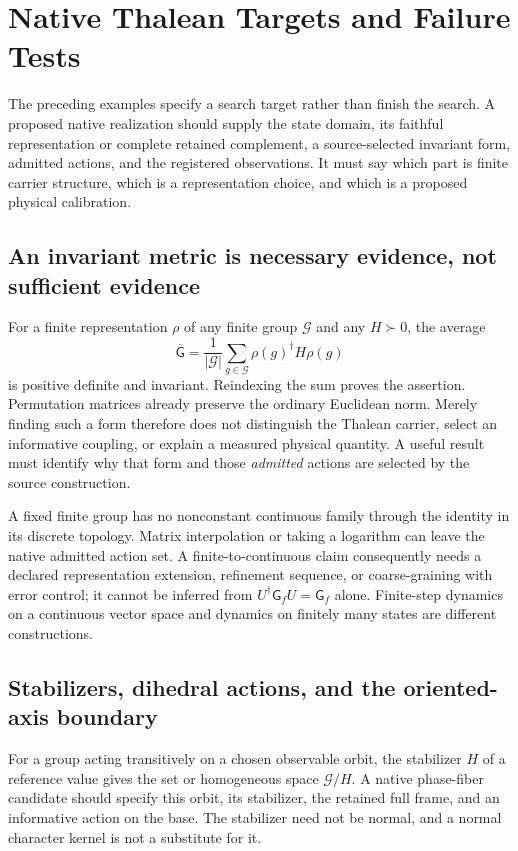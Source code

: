 \begingroup
\renewcommand{\thesection}{37D}
\section{Native Thalean Targets and Failure Tests}\label{sec:nativedynamics}
The preceding examples specify a search target rather than finish the search. A proposed native realization should supply the state domain, its faithful representation or complete retained complement, a source-selected invariant form, admitted actions, and the registered observations. It must say which part is finite carrier structure, which is a representation choice, and which is a proposed physical calibration.

\subsection{An invariant metric is necessary evidence, not sufficient evidence}
For a finite representation $\rho$ of any finite group $\mathcal G$ and any $H\succ0$, the average
\[
\overline{\mathsf G}
=\frac1{|\mathcal G|}\sum_{g\in\mathcal G}\rho(g)^\dagger H\rho(g)
\]
is positive definite and invariant. Reindexing the sum proves the assertion. Permutation matrices already preserve the ordinary Euclidean norm. Merely finding such a form therefore does not distinguish the Thalean carrier, select an informative coupling, or explain a measured physical quantity. A useful result must identify why that form and those \emph{admitted} actions are selected by the source construction.

A fixed finite group has no nonconstant continuous family through the identity in its discrete topology. Matrix interpolation or taking a logarithm can leave the native admitted action set. A finite-to-continuous claim consequently needs a declared representation extension, refinement sequence, or coarse-graining with error control; it cannot be inferred from $U^\dagger\mathsf G_fU=\mathsf G_f$ alone. Finite-step dynamics on a continuous vector space and dynamics on finitely many states are different constructions.

\subsection{Stabilizers, dihedral actions, and the oriented-axis boundary}
For a group acting transitively on a chosen observable orbit, the stabilizer $H$ of a reference value gives the set or homogeneous space $\mathcal G/H$. A native phase-fiber candidate should specify this orbit, its stabilizer, the retained full frame, and an informative action on the base. The stabilizer need not be normal, and a normal character kernel is not a substitute for it.


